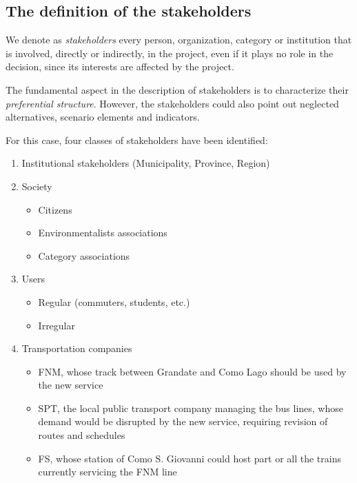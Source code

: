 \subsection{The definition of the stakeholders}
\label{subsec:comostakeholders}

We denote as \textit{stakeholders} every person, organization, category or institution that is involved, directly or indirectly, in the project, even if it plays no role in the decision, since its interests are affected by the project.

The fundamental aspect in the description of stakeholders is to characterize their \textit{preferential structure}. However, the stakeholders could also point out neglected alternatives, scenario elements and indicators.

For this case, four classes of stakeholders have been identified: 
\begin{enumerate}
	\item Institutional stakeholders (Municipality, Province, Region)
	
	\item Society
	\begin{itemize}
		\item Citizens
		
		\item Environmentalists associations
		
		\item Category associations
	\end{itemize}
	
	\item Users
	\begin{itemize}
		\item Regular (commuters, students, etc.)
		
		\item Irregular
	\end{itemize}
	
	\item Transportation companies 
	\begin{itemize}
		\item FNM, whose track between Grandate and Como Lago should be used by the new service
		
		\item SPT, the local public transport company managing the bus lines, whose demand would be disrupted by the new service, requiring revision of routes and schedules
		
		\item FS, whose station of Como S. Giovanni could host part or all the trains currently servicing the FNM line
	\end{itemize}
\end{enumerate}

